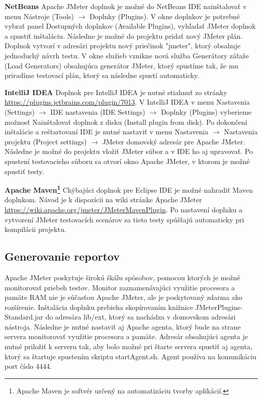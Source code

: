 \documentclass[12pt,oneside,final]{fithesis-utf8}
\begin{document}
\noindent\textbf{NetBeans}
\newline
Apache JMeter doplnok je možné do NetBeans IDE nainštalovať v menu Nástroje (Tools) $\rightarrow$ Doplnky (Plugins). V okne doplnkov je potrebné vybrať panel Dostupných doplnkov (Available Plugins), vyhľadať JMeter doplnok a spustiť inštaláciu. Následne je možné do projektu pridať nový JMeter plán. Doplnok vytvorí v adresári projektu nový priečinok "jmeter", ktorý obsahuje jednoduchý návrh testu. V okne služieb vznikne nová služba Generátory záťaže (Load Generators) obsahujúca generátor JMeter, ktorý spustíme tak, že mu priradíme testovací plán, ktorý sa následne spustí automaticky.
\newline

\noindent\textbf{IntelliJ IDEA}
\newline
Doplnok pre IntelliJ IDEA je nutné stiahnuť zo stránky \url{https://plugins.jetbrains.com/plugin/7013}.  V IntelliJ IDEA v menu Nastavenia (Settings) $\rightarrow$ IDE nastavenia (IDE Settings) $\rightarrow$ Doplnky (Plugins) vyberieme možnosť Nainštalovať doplnok z disku (Install plugin from disk). Po dokončení inštalácie a reštartovaní IDE je nutné nastaviť v menu Nastavenia $\rightarrow$ Nastavenia projektu (Project settings) $\rightarrow$ JMeter domovský adresár pre Apache JMeter. Následne je možné do projektu vložiť JMeter súbor a v IDE ho aj upravovať. Po spustení testovacieho súboru sa otvorí okno Apache JMeter, v ktorom je možné spustiť testy.
\newline

\newpage
\noindent\textbf{Apache Maven\footnote{Apache Maven je softvér určený na automatizáciu tvorby aplikácií.}}
\newline
Chýbajúci doplnok pre Eclipse IDE je možné nahradiť Maven doplnkom. Návod je k dispozícii na wiki stránke Apache JMeter \url{https://wiki.apache.org/jmeter/JMeterMavenPlugin}. Po nastavení doplnku a vytvorení JMeter testovacích scenárov sa tieto testy spúšťajú automaticky pri kompilácii projektu.

\subsection{Generovanie reportov}
Apache JMeter poskytuje širokú škálu spôsobov, pomocou ktorých je možné monitorovať priebeh testov. Monitor zaznamenávajúci využitie procesora a pamäte RAM nie je súčasťou Apache JMeter, ale je poskytovaný zdarma ako rozšírenie. Inštalácia doplnku prebieha skopírovaním knižnice JMeterPlugins-Standard.jar do adresára lib/ext, ktorý sa nachádza v domovskom adresári nástroja. Následne je nutné nastaviť aj Apache agenta, ktorý bude na strane servera monitorovať využitie procesora a pamäte. Adresár obsahujúci agenta je nutné priložiť k serveru tak, aby bolo možné pri štarte servera spustiť aj agenta, ktorý sa štartuje spustením skriptu startAgent.sh. Agent používa na komunikáciu port číslo 4444.
\end{document}

